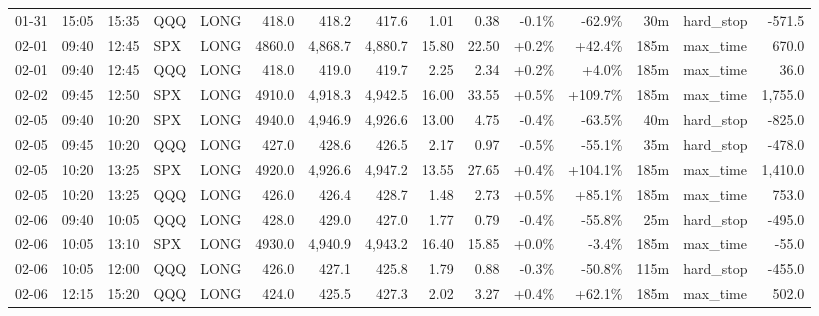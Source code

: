 \documentclass[11pt,a4paper,twoside]{article}
\begin{document}
\begin{landscape}
\begin{center}
\begin{longtable}{>{\color{txtmain}}l l l l l r r r r r r r r >{\color{txtmain}}l r}
01-31 & 15:05 & 15:35 & QQQ & LONG & 418.0 & 418.2 & 417.6 & 1.01 & 0.38 & \textcolor{lossred}{-0.1\%} & \textcolor{lossred}{-62.9\%} & 30m & hard\_stop & \textcolor{lossred}{-571.5} \\
02-01 & 09:40 & 12:45 & SPX & LONG & 4860.0 & 4,868.7 & 4,880.7 & 15.80 & 22.50 & \textcolor{wingreen}{+0.2\%} & \textcolor{wingreen}{+42.4\%} & 185m & max\_time & \textcolor{wingreen}{670.0} \\
02-01 & 09:40 & 12:45 & QQQ & LONG & 418.0 & 419.0 & 419.7 & 2.25 & 2.34 & \textcolor{wingreen}{+0.2\%} & \textcolor{wingreen}{+4.0\%} & 185m & max\_time & \textcolor{wingreen}{36.0} \\
02-02 & 09:45 & 12:50 & SPX & LONG & 4910.0 & 4,918.3 & 4,942.5 & 16.00 & 33.55 & \textcolor{wingreen}{+0.5\%} & \textcolor{wingreen}{+109.7\%} & 185m & max\_time & \textcolor{wingreen}{1,755.0} \\
02-05 & 09:40 & 10:20 & SPX & LONG & 4940.0 & 4,946.9 & 4,926.6 & 13.00 & 4.75 & \textcolor{lossred}{-0.4\%} & \textcolor{lossred}{-63.5\%} & 40m & hard\_stop & \textcolor{lossred}{-825.0} \\
02-05 & 09:45 & 10:20 & QQQ & LONG & 427.0 & 428.6 & 426.5 & 2.17 & 0.97 & \textcolor{lossred}{-0.5\%} & \textcolor{lossred}{-55.1\%} & 35m & hard\_stop & \textcolor{lossred}{-478.0} \\
02-05 & 10:20 & 13:25 & SPX & LONG & 4920.0 & 4,926.6 & 4,947.2 & 13.55 & 27.65 & \textcolor{wingreen}{+0.4\%} & \textcolor{wingreen}{+104.1\%} & 185m & max\_time & \textcolor{wingreen}{1,410.0} \\
02-05 & 10:20 & 13:25 & QQQ & LONG & 426.0 & 426.4 & 428.7 & 1.48 & 2.73 & \textcolor{wingreen}{+0.5\%} & \textcolor{wingreen}{+85.1\%} & 185m & max\_time & \textcolor{wingreen}{753.0} \\
02-06 & 09:40 & 10:05 & QQQ & LONG & 428.0 & 429.0 & 427.0 & 1.77 & 0.79 & \textcolor{lossred}{-0.4\%} & \textcolor{lossred}{-55.8\%} & 25m & hard\_stop & \textcolor{lossred}{-495.0} \\
02-06 & 10:05 & 13:10 & SPX & LONG & 4930.0 & 4,940.9 & 4,943.2 & 16.40 & 15.85 & \textcolor{wingreen}{+0.0\%} & \textcolor{lossred}{-3.4\%} & 185m & max\_time & \textcolor{lossred}{-55.0} \\
02-06 & 10:05 & 12:00 & QQQ & LONG & 426.0 & 427.1 & 425.8 & 1.79 & 0.88 & \textcolor{lossred}{-0.3\%} & \textcolor{lossred}{-50.8\%} & 115m & hard\_stop & \textcolor{lossred}{-455.0} \\
02-06 & 12:15 & 15:20 & QQQ & LONG & 424.0 & 425.5 & 427.3 & 2.02 & 3.27 & \textcolor{wingreen}{+0.4\%} & \textcolor{wingreen}{+62.1\%} & 185m & max\_time & \textcolor{wingreen}{502.0} \\

\end{longtable}
\end{center}
\end{landscape}
\end{document}
